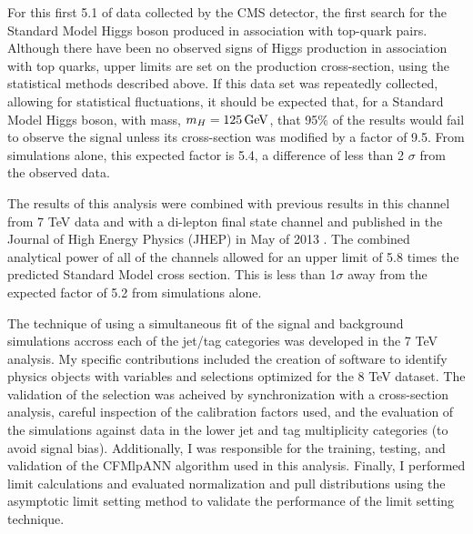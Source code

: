 \par  For this first 5.1 \fbinv of data collected by the CMS detector,
the first search for the Standard Model Higgs boson produced in
association with top-quark pairs.  Although there have been no
observed signs of Higgs production in association with top quarks,
upper limits are set on the production cross-section,  using the
statistical methods  described above.  If this data set was repeatedly
collected, allowing for statistical fluctuations, it should be
expected that, for a Standard Model Higgs boson, with mass, $m_{H} =
125 \,\text{Ge\hspace{-.08em}V}$, that 95$\%$ of the results would fail to observe the \ttH
signal unless its cross-section was modified by a factor of 9.5.  From
simulations alone, this expected factor is 5.4, a difference of less
than 2 $\sigma$ from the observed data.    

\par The results of this analysis were combined with previous results
in this channel from 7 TeV data and with a di-lepton final state
channel and published in the Journal of High Energy Physics (JHEP) in
May of 2013 \cite{Chatrchyan:2013yea}.  The combined analytical power
of all of the channels allowed for an upper limit of 5.8 times
the predicted Standard Model cross section.  This is less than
1$\sigma$ away from the expected factor of 5.2 from simulations
alone.  

\par The technique of using a simultaneous fit of the signal and
background simulations accross each of the jet/tag categories was
developed in the 7 TeV analysis.  My specific contributions included
the creation of software to identify physics objects with variables
and selections optimized for the 8 TeV dataset.  The validation of the
selection was acheived by synchronization with a \ttbar cross-section
analysis, careful inspection of the calibration factors used, and the
evaluation of the simulations against data in the lower jet and tag
multiplicity categories (to avoid signal bias).  Additionally, I was
responsible for the training, testing, and validation of the CFMlpANN
algorithm used in this analysis.  Finally, I performed limit
calculations and evaluated normalization and pull distributions using
the asymptotic limit setting method to validate the performance of the
limit setting technique.  
